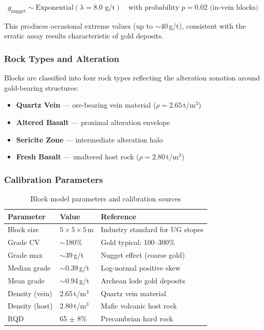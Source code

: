 \documentclass[12pt,a4paper]{article}
\begin{document}
\begin{equation}
    g_{\text{nugget}} \sim \text{Exponential}(\lambda = 8.0 \text{ g/t}) \quad \text{with probability } p = 0.02 \text{ (in-vein blocks)}
\end{equation}

This produces occasional extreme values (up to $\sim$40\,g/t), consistent with the erratic assay results characteristic of gold deposits.

\subsubsection{Rock Types and Alteration}

Blocks are classified into four rock types reflecting the alteration zonation around gold-bearing structures:

\begin{itemize}[itemsep=0.1em]
    \item \textbf{Quartz Vein} --- ore-bearing vein material ($\rho = 2.65$\,t/m$^3$)
    \item \textbf{Altered Basalt} --- proximal alteration envelope
    \item \textbf{Sericite Zone} --- intermediate alteration halo
    \item \textbf{Fresh Basalt} --- unaltered host rock ($\rho = 2.80$\,t/m$^3$)
\end{itemize}

\subsubsection{Calibration Parameters}

\begin{table}[H]
\centering
\caption{Block model parameters and calibration sources}
\begin{tabular}{@{}lll@{}}
\toprule
\textbf{Parameter} & \textbf{Value} & \textbf{Reference} \\
\midrule
Block size & $5 \times 5 \times 5$\,m & Industry standard for UG stopes \\
Grade CV & $\sim$180\% & Gold typical: 100--300\% \\
Grade max & $\sim$39\,g/t & Nugget effect (coarse gold) \\
Median grade & $\sim$0.39\,g/t & Log-normal positive skew \\
Mean grade & $\sim$0.94\,g/t & Archean lode gold deposits \\
Density (vein) & 2.65\,t/m$^3$ & Quartz vein material \\
Density (host) & 2.80\,t/m$^3$ & Mafic volcanic host rock \\
RQD & 65 $\pm$ 8\% & Precambrian hard rock \\
\bottomrule
\end{tabular}
\label{tab:calibration}
\end{table}
\end{document}
